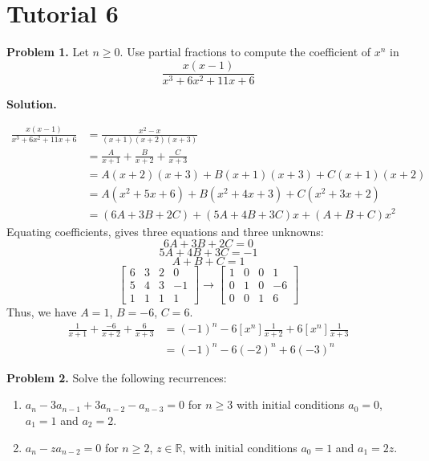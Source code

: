 \section{Tutorial 6}
\textbf{Problem 1.}
Let $ n\geqslant 0 $. Use partial fractions to compute the coefficient of $ x^n $
in
\[ \frac{x(x-1)}{x^3+6x^2+11x+6} \]

\textbf{Solution.}

\begin{align*} \frac{x(x-1)}{x^3+6x^2+11x+6}
     & =\frac{x^2-x}{(x+1)(x+2)(x+3)}                 \\
     & =\frac{A}{x+1} + \frac{B}{x+2} + \frac{C}{x+3} \\
     & =A(x+2)(x+3)+B(x+1)(x+3)+C(x+1)(x+2)           \\
     & =A(x^2+5x+6)+B(x^2+4x+3)+C(x^2+3x+2)           \\
     & =(6A+3B+2C) + (5A+4B+3C)x + (A+B+C)x^2
\end{align*}
Equating coefficients, gives three equations and three unknowns:
\[ 6A+3B+2C=0 \]
\[ 5A+4B+3C=-1 \]
\[ A+B+C=1 \]
\[
    \left[\begin{array}{ccc|c}
            6 & 3 & 2 & 0  \\
            5 & 4 & 3 & -1 \\
            1 & 1 & 1 & 1
        \end{array}\right]
    \rightarrow{}
    \left[\begin{array}{ccc|c}
            1 & 0 & 0 & 1  \\
            0 & 1 & 0 & -6 \\
            0 & 0 & 1 & 6
        \end{array}\right]
\]
Thus, we have $ A=1 $, $ B=-6 $, $ C=6 $.
\begin{align*}
    \frac{1}{x+1} + \frac{-6}{x+2} + \frac{6}{x+3}
     & = (-1)^n - 6[x^n]\frac{1}{x+2} + 6[x^n]\frac{1}{x+3} \\
     & = (-1)^n - 6 (-2)^n + 6(-3)^n
\end{align*}

\textbf{Problem 2.} Solve the following recurrences:
\begin{enumerate}[label=(\alph*)]
    \item $ a_n-3a_{n-1}+3a_{n-2}-a_{n-3}=0 $ for $ n\geqslant 3 $
          with initial conditions $ a_0=0 $, $ a_1=1 $ and $ a_2=2 $.
    \item $ a_n-za_{n-2}=0 $ for $ n\geqslant 2 $, $ z\in\mathbb{R} $,
          with initial conditions $ a_0=1 $ and $ a_1=2z $.
\end{enumerate}


